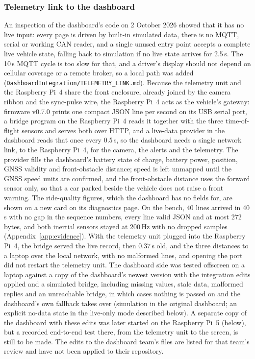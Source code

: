 \subsubsection*{Telemetry link to the dashboard}
\label{sec:dashboard-link}
An inspection of the dashboard's code on 2 October 2026 showed that it has no live input: every page is driven by built-in simulated data, there is no MQTT, serial or working CAN reader, and a single unused entry point accepts a complete live vehicle state, falling back to simulation if no live state arrives for 2.5\,s. The 10\,s MQTT cycle is too slow for that, and a driver's display should not depend on cellular coverage or a remote broker, so a local path was added (\texttt{DashboardIntegration/TELEMETRY\_LINK.md}). Because the telemetry unit and the Raspberry Pi~4 share the front enclosure, already joined by the camera ribbon and the sync-pulse wire, the Raspberry Pi~4 acts as the vehicle's gateway: firmware v0.7.0 prints one compact JSON line per second on its USB serial port, a bridge program on the Raspberry Pi~4 reads it together with the three time-of-flight sensors and serves both over HTTP, and a live-data provider in the dashboard reads that once every 0.5\,s, so the dashboard needs a single network link, to the Raspberry Pi~4, for the camera, the alerts and the telemetry. The provider fills the dashboard's battery state of charge, battery power, position, GNSS validity and front-obstacle distance; speed is left unmapped until the GNSS speed units are confirmed, and the front-obstacle distance uses the forward sensor only, so that a car parked beside the vehicle does not raise a front warning. The ride-quality figures, which the dashboard has no fields for, are shown on a new card on its diagnostics page. On the bench, 40 lines arrived in 40\,s with no gap in the sequence numbers, every line valid JSON and at most 272 bytes, and both inertial sensors stayed at 200\,Hz with no dropped samples (Appendix~\ref{app:evidence}). With the telemetry unit plugged into the Raspberry Pi~4, the bridge served the live record, then 0.37\,s old, and the three distances to a laptop over the local network, with no malformed lines, and opening the port did not restart the telemetry unit. The dashboard side was tested offscreen on a laptop against a copy of the dashboard's newest version with the integration edits applied and a simulated bridge, including missing values, stale data, malformed replies and an unreachable bridge, in which cases nothing is passed on and the dashboard's own fallback takes over (simulation in the original dashboard; an explicit no-data state in the live-only mode described below). A separate copy of the dashboard with these edits was later started on the Raspberry Pi~5 (below), but a recorded end-to-end test there, from the telemetry unit to the screen, is still to be made. The edits to the dashboard team's files are listed for that team's review and have not been applied to their repository.


